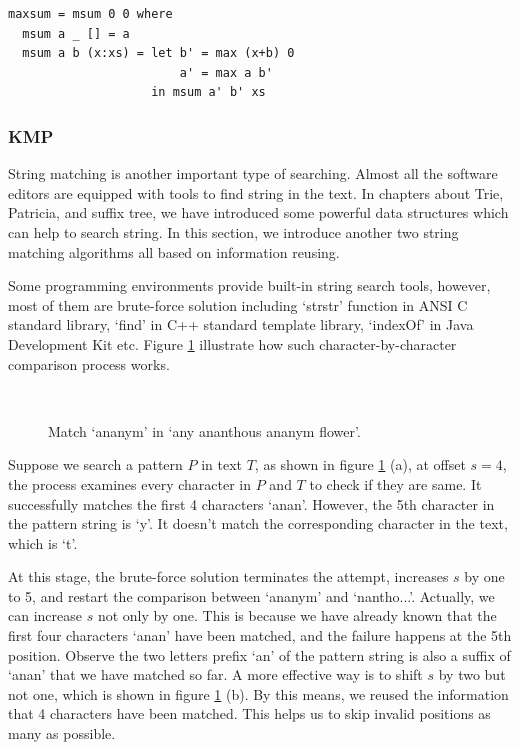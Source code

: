 \documentclass[UTF8]{article}
\begin{document}
\lstset{language=Haskell}
\begin{lstlisting}
maxsum = msum 0 0 where
  msum a _ [] = a
  msum a b (x:xs) = let b' = max (x+b) 0
                        a' = max a b'
                    in msum a' b' xs
\end{lstlisting}

\subsubsection{KMP}
 
String matching is another important type of searching. Almost all the software editors are equipped with
tools to find string in the text.
In chapters about Trie, Patricia, and suffix tree, we have introduced some powerful data structures which
can help to search string. In this section, we introduce another two string matching algorithms all based on
information reusing.

Some programming environments provide built-in string search tools, however, most of them are brute-force solution
including `strstr' function in ANSI C standard library, `find' in C++ standard template library, `indexOf' in Java
Development Kit etc. Figure \ref{fig:strstr} illustrate how such character-by-character comparison process works.

\begin{figure}[htbp]
 \centering
  \\
 \caption{Match `ananym' in `any ananthous ananym flower'.}
 \label{fig:strstr}
\end{figure}

Suppose we search a pattern $P$ in text $T$, as shown in figure \ref{fig:strstr} (a), at offset $s = 4$,
the process examines every character in $P$ and $T$ to check if they are same. It successfully matches
the first 4 characters `anan'. However, the 5th character in the pattern string is `y'. It doesn't match
the corresponding character in the text, which is `t'.

At this stage, the brute-force solution terminates the attempt, increases $s$ by one to 5, and restart the
comparison between `ananym' and `nantho...'. Actually, we can increase $s$ not only by one. This is because
we have already known that the first four characters `anan' have been matched, and the failure happens
at the 5th position. Observe the two letters prefix `an' of the pattern string is also a suffix of
`anan' that we have matched so far. A more effective way is to shift $s$ by two but not one, which is
shown in figure \ref{fig:strstr} (b). By this means, we reused the information that 4 characters have
been matched. This helps us to skip invalid positions as many as possible.
\end{document}
